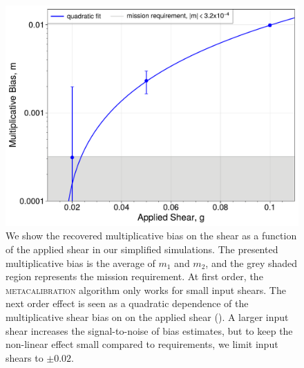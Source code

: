 \documentclass[fleqn,usenatbib]{mnras}
\begin{document}
\begin{figure}
	\includegraphics[width=\columnwidth]{metacal_bias_shear_pplt.pdf}
    \caption{We show the recovered multiplicative bias on the shear as a function of the applied shear in our simplified simulations. The presented multiplicative bias is the average of $m_{1}$ and $m_{2}$, and the grey shaded region represents the mission requirement. At first order, the \textsc{metacalibration} algorithm only works for small input shears. The next order effect is seen as a quadratic dependence of the multiplicative shear bias on on the applied shear (\citealt{2017ApJ...841...24S}). A larger input shear increases the signal-to-noise of bias estimates, but to keep the non-linear effect small compared to requirements, we limit input shears to $\pm 0.02$. }
    \label{fig:metacal_shear_linear}
\end{figure}
\end{document}
